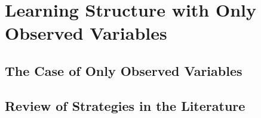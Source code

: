 \section{Learning Structure with Only Observed Variables}
\subsection{The Case of Only Observed Variables}
\subsection{Review of Strategies in the Literature}